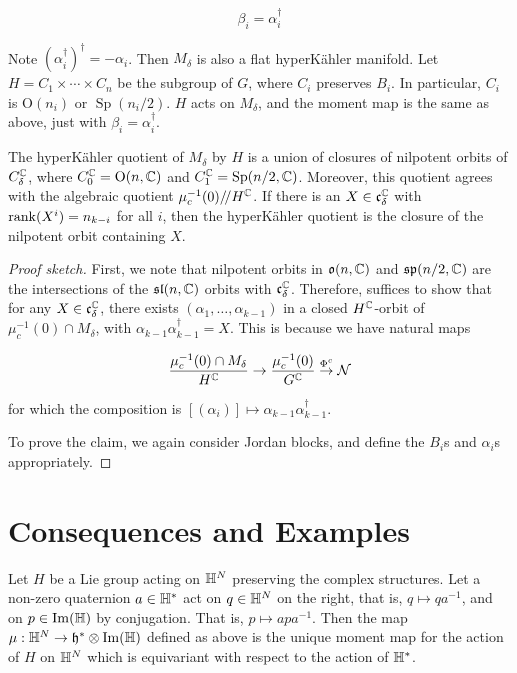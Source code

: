 \documentclass{article}
\DeclareMathOperator{\Sp}{Sp}
\newcommand{\sslash}{/\!/}
\renewcommand{\sl}{\mfs\mfl}
\renewcommand{\sp}{\mfs\mfp}
\begin{document}
\[\beta_i = \alpha_i^\dagger\]

Note \((\alpha_i^\dagger)^\dagger = -\alpha_i\). Then \(M_\delta\) is also a flat hyperK\"ahler manifold. Let \(H = C_1 \times \cdots \times C_n\) be the subgroup of \(G\), where \(C_i\) preserves \(B_i\). In particular, \(C_i\) is \(\mathrm{O}(n_i)\) or \(\Sp(n_i/2)\). \(H\) acts on \(M_\delta\), and the moment map is the same as above, just with \(\beta_i = \alpha_i^\dagger\).

\begin{theorem}
    The hyperK\"ahler quotient of \(M_\delta\) by \(H\) is a union of closures of nilpotent orbits of \(C_\delta^{\mathbb{C}}\), where \(C_0^{\mathbb{C}} = \mathrm{O}(n, \mathbb{C})\) and \(C_1^\C = \Sp(n/2, \C)\). Moreover, this quotient agrees with the algebraic quotient \(\mu_c^{-1}(0)\sslash H^\C\). If there is an \(X \in \mathfrak{c}_\delta^{\mathbb{C}}\) with \(\rank(X^i) = n_{k-i}\) for all \(i\), then the hyperK\"ahler quotient is the closure of the nilpotent orbit containing \(X\).
\end{theorem}

\begin{proof}
    [Proof sketch]

    First, we note that nilpotent orbits in \(\mathfrak{o}(n, \mathbb{C})\) and \(\sp(n/2, \C)\) are the intersections of the \(\sl(n, \C)\) orbits with \(\mathfrak{c}_\delta^{\mathbb{C}}\). Therefore, suffices to show that for any \(X \in \mathfrak{c}_\delta^{\mathbb{C}}\), there exists \((\alpha_1, \dots, \alpha_{k-1})\) in a closed \(H^{\mathbb{C}}\)-orbit of \(\mu_c^{-1}(0) \cap M_\delta\), with \(\alpha_{k-1}\alpha_{k-1}^\dagger = X\). This is because we have natural maps

    \[\frac{\mu_c^{-1}(0) \cap M_\delta}{H^{\mathbb{C}}} \to \frac{\mu_c^{-1}(0)}{G^{\mathbb{C}}} \stackrel{\Phi^c}{\to} \mathcal{N}\]

    for which the composition is \([(\alpha_i)] \mapsto \alpha_{k-1}\alpha_{k-1}^\dagger\).

    To prove the claim, we again consider Jordan blocks, and define the \(B_i\)s and \(\alpha_i\)s appropriately.
\end{proof}

\section{Consequences and Examples}

\begin{lemma}
    Let \(H\) be a Lie group acting on \(\mathbb{H}^N\) preserving the complex structures. Let a non-zero quaternion \(a \in \mathbb{H}^*\) act on \(q \in \mathbb{H}^N\) on the right, that is, \(q \mapsto qa^{-1}\), and on \(p \in \Im(\mathbb{H})\) by conjugation. That is, \(p \mapsto apa^{-1}\). Then the map \(\mu : \mathbb{H}^N \to \mathfrak{h}^* \otimes \Im(\mathbb{H})\) defined as above is the unique moment map for the action of \(H\) on \(\mathbb{H}^N\) which is equivariant with respect to the action of \(\mathbb{H}^*\).
\end{lemma}
\end{document}
